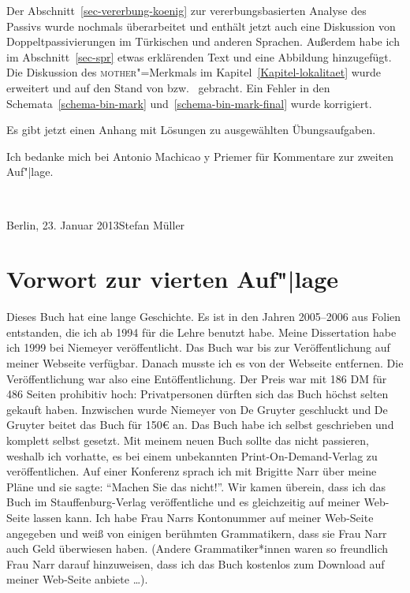 Der Abschnitt~\ref{sec-vererbung-koenig} zur vererbungsbasierten Analyse des Passivs wurde nochmals
überarbeitet und enthält jetzt auch eine Diskussion von Doppeltpassivierungen im Türkischen und
anderen Sprachen. Außerdem habe ich im Abschnitt~\ref{sec-spr} etwas erklärenden Text und eine
Abbildung hinzugefügt. Die Diskussion des \textsc{mother}"=Merkmals im Kapitel~\ref{Kapitel-lokalitaet} wurde erweitert und auf
den Stand von  bzw.\  gebracht. 
Ein Fehler in den Schemata~\ref{schema-bin-mark} und~\ref{schema-bin-mark-final} wurde korrigiert.

Es gibt jetzt einen Anhang mit Lösungen zu ausgewählten Übungsaufgaben.

Ich bedanke mich bei Antonio Machicao y Priemer für Kommentare zur zweiten Auf"|lage.

~\medskip

\noindent
Berlin, 23. Januar 2013\hfill Stefan Müller


\section*{Vorwort zur vierten Auf"|lage}

Dieses Buch hat eine lange Geschichte. Es ist in den Jahren 2005–2006 aus Folien entstanden, die ich
ab 1994 für die Lehre benutzt habe. Meine Dissertation habe ich 1999 bei Niemeyer
veröffentlicht. Das Buch war bis zur Veröffentlichung auf meiner Webseite verfügbar. Danach musste
ich es von der Webseite entfernen. Die Veröffentlichung war also eine Entöffentlichung. Der Preis
war mit 186 DM für 486 Seiten prohibitiv hoch: Privatpersonen dürften sich das Buch höchst selten
gekauft haben. Inzwischen wurde Niemeyer von De Gruyter geschluckt und De Gruyter beitet das Buch für 150€
an. Das Buch habe ich selbst geschrieben und komplett selbst gesetzt. Mit meinem neuen Buch sollte das nicht passieren,
weshalb ich vorhatte, es bei einem unbekannten Print-On-Demand-Verlag zu veröffentlichen. Auf einer
Konferenz sprach ich mit Brigitte Narr über meine Pläne und sie sagte: "`Machen Sie das
nicht!"'. Wir kamen überein, dass ich das Buch im Stauffenburg-Verlag veröffentliche und es
gleichzeitig auf meiner Web-Seite lassen kann. Ich habe Frau Narrs Kontonummer auf meiner Web-Seite
angegeben und weiß von einigen berühmten Grammatikern, dass sie Frau Narr auch Geld überwiesen
haben. (Andere Grammatiker*innen waren so freundlich Frau Narr darauf hinzuweisen, dass ich das Buch
kostenlos zum Download auf meiner Web-Seite anbiete \ldots). 

